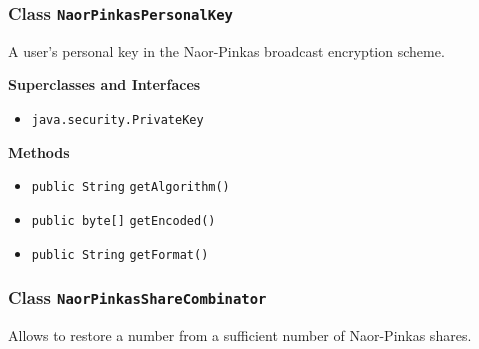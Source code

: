 \subsubsection{Class \lstinline|NaorPinkasPersonalKey|}
A user's personal key in the Naor-Pinkas broadcast encryption scheme. \\
\noindent\begin{minipage}[t]{5cm}
\vspace{0.3em}
\hspace*{2em}
\vspace{0.3em}
\end{minipage}



\textbf{\sffamily Superclasses and Interfaces}
\begin{itemize}
\item \lstinline|java.security.PrivateKey|
\end{itemize}



\textbf{\sffamily Methods}
\begin{itemize}
\item \lstinline|public String| \lstinline|getAlgorithm|\lstinline|()| \\[-0.6em]




\item \lstinline|public byte[]| \lstinline|getEncoded|\lstinline|()| \\[-0.6em]




\item \lstinline|public String| \lstinline|getFormat|\lstinline|()| \\[-0.6em]




\end{itemize}

\subsubsection{Class \lstinline|NaorPinkasShareCombinator|}
Allows to restore a number from a sufficient number of Naor-Pinkas shares. \\
\noindent\begin{minipage}[t]{5cm}
\vspace{0.3em}
\hspace*{2em}
\vspace{0.3em}
\end{minipage}



